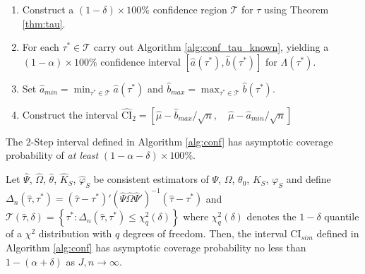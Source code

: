\begin{alg}[2-Step CI]
\label{alg:conf}
\mbox{}
\begin{enumerate}
  \item Construct a $(1-\delta)\times 100\%$ confidence region $\mathscr{T}$ for $\tau$ using Theorem \ref{thm:tau}. 
  \item For each $\tau^* \in \mathscr{T}$ carry out Algorithm \ref{alg:conf_tau_known}, yielding a $(1 - \alpha)\times 100\%$ confidence interval $\left[\widehat{a}(\tau^*),\widehat{b}(\tau^*)\right]$ for $\Lambda(\tau^*)$.  
	\item Set $\displaystyle \widehat{a}_{min}=\min_{\tau^* \in \mathscr{T}} \widehat{a}(\tau^*)$ and $\displaystyle \widehat{b}_{max}= \max_{\tau^* \in \mathscr{T}} \widehat{b}(\tau^*)$. 
	\item Construct the interval 
    $ \widehat{\mbox{CI}}_{2}=\left[ \widehat{\mu} - \widehat{b}_{max}/\sqrt{n}, \quad \widehat{\mu} - \widehat{a}_{min}/\sqrt{n} \right]$
\end{enumerate}
\end{alg}

The 2-Step interval defined in Algorithm \ref{alg:conf} has asymptotic coverage probability of \emph{at least} $(1-\alpha-\delta)\times 100\%$.

\begin{thm}[2-Step CI]
\label{thm:sim}
Let $\widehat{\Psi}$, $\widehat{\Omega}$, $\widehat{\theta}$, $\widehat{K}_S$, $\widehat{\varphi}_S$ be consistent estimators of $\Psi$, $\Omega$, $\theta_0$, $K_S$, $\varphi_S$ and define 
$\Delta_n(\widehat{\tau},\tau^*) = \left(\widehat{\tau} - \tau^*\right)' (\widehat{\Psi}\widehat{\Omega}\widehat{\Psi}')^{-1} \left(\widehat{\tau} - \tau^*\right)$ 
and 
$\mathscr{T}(\widehat{\tau},\delta) = \left\{\tau^* \colon  \Delta_n(\widehat{\tau},\tau^*) \leq \chi^2_q(\delta)\right\}$
where $\chi^2_q(\delta)$ denotes the $1-\delta$ quantile of a $\chi^2$ distribution with $q$ degrees of freedom.
Then, the interval $\mbox{CI}_{sim}$ defined in Algorithm \ref{alg:conf} has asymptotic coverage probability no less than $1-(\alpha + \delta)$ as $J,n\rightarrow \infty$.
\end{thm}

